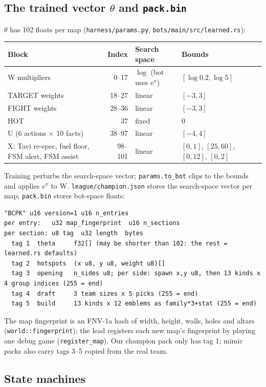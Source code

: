 \documentclass[11pt,a4paper]{article}
\newcommand{\f}[1]{\texttt{#1}}
\begin{document}
\subsection{The trained vector $\theta$ and \f{pack.bin}}
$\theta$ has 102 floats per map (\f{harness/params.py}, \f{bots/main/src/learned.rs}):
\begin{center}\small
\begin{tabular}{@{}lrll@{}}
\toprule
Block & Index & Search space & Bounds\\
\midrule
W multipliers & 0--17 & $\log$ (bot uses $e^x$) & $[\log 0.2, \log 5]$\\
TARGET weights & 18--27 & linear & $[-3, 3]$\\
FIGHT weights & 28--36 & linear & $[-3, 3]$\\
HOT & 37 & fixed & 0\\
U (6 actions $\times$ 10 facts) & 38--97 & linear & $[-4, 4]$\\
X: Tavi re-spec, fuel floor, FSM alert, FSM assist & 98--101 & linear & $[0,1]$, $[25,60]$, $[0,12]$, $[0,2]$\\
\bottomrule
\end{tabular}
\end{center}
Training perturbs the search-space vector; \f{params.to\_bot} clips to the bounds and applies $e^x$ to W.
\f{league/champion.json} stores the search-space vector per map; \f{pack.bin} stores bot-space floats:
\begin{lstlisting}
"BCPK" u16 version=1 u16 n_entries
per entry:   u32 map_fingerprint  u16 n_sections
per section: u8 tag  u32 length  bytes
  tag 1  theta     f32[] (may be shorter than 102: the rest = learned.rs defaults)
  tag 2  hotspots  (x u8, y u8, weight u8)[]
  tag 3  opening   n_sides u8; per side: spawn x,y u8, then 13 kinds x 4 group indices (255 = end)
  tag 4  draft     3 team sizes x 5 picks (255 = end)
  tag 5  build     13 kinds x 12 emblems as family*3+stat (255 = end)
\end{lstlisting}
The map fingerprint is an FNV-1a hash of width, height, walls, holes and altars (\f{world::fingerprint}); the
lead registers each new map's fingerprint by playing one debug game (\f{register\_map}). Our champion pack
only has tag 1; mimic packs also carry tags 3--5 copied from the real team.

\subsection{State machines}
\end{document}
